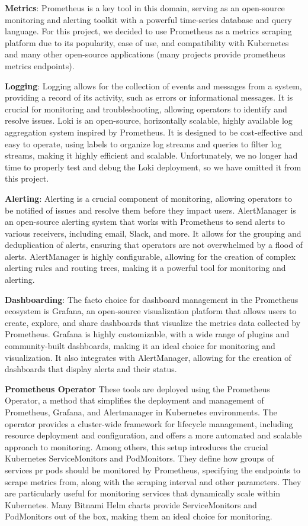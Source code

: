 \documentclass{report}
\begin{document}
    \textbf{Metrics}:
    Prometheus is a key tool in this domain, serving as an open-source monitoring and alerting toolkit with a powerful time-series database and query language. For this project, we decided to use Prometheus as a metrics scraping platform due to its popularity, ease of use, and compatibility with Kubernetes and many other open-source applications (many projects provide prometheus metrics endpoints).

    \textbf{Logging}:
    Logging allows for the collection of events and messages from a system, providing a record of its activity, such as errors or informational messages. It is crucial for monitoring and troubleshooting, allowing operators to identify and resolve issues. Loki is an open-source, horizontally scalable, highly available log aggregation system inspired by Prometheus. It is designed to be cost-effective and easy to operate, using labels to organize log streams and queries to filter log streams, making it highly efficient and scalable. Unfortunately, we no longer had time to properly test and debug the Loki deployment, so we have omitted it from this project.

    \textbf{Alerting}:
    Alerting is a crucial component of monitoring, allowing operators to be notified of issues and resolve them before they impact users. AlertManager is an open-source alerting system that works with Prometheus to send alerts to various receivers, including email, Slack, and more. It allows for the grouping and deduplication of alerts, ensuring that operators are not overwhelmed by a flood of alerts. AlertManager is highly configurable, allowing for the creation of complex alerting rules and routing trees, making it a powerful tool for monitoring and alerting.

    \textbf{Dashboarding}:
    The facto choice for dashboard management in the Prometheus ecosystem is Grafana, an open-source visualization platform that allows users to create, explore, and share dashboards that visualize the metrics data collected by Prometheus. Grafana is highly customizable, with a wide range of plugins and community-built dashboards, making it an ideal choice for monitoring and visualization. It also integrates with AlertManager, allowing for the creation of dashboards that display alerts and their status.

    \textbf{Prometheus Operator}
    These tools are deployed using the Prometheus Operator, a method that simplifies the deployment and management of Prometheus, Grafana, and Alertmanager in Kubernetes environments. The operator provides a cluster-wide framework for lifecycle management, including resource deployment and configuration, and offers a more automated and scalable approach to monitoring. Among others, this setup introduces the crucial Kubernetes ServiceMonitors and PodMonitors. They define how groups of services pr pods should be monitored by Prometheus, specifying the endpoints to scrape metrics from, along with the scraping interval and other parameters. They are particularly useful for monitoring services that dynamically scale within Kubernetes. Many Bitnami Helm charts provide ServiceMonitors and PodMonitors out of the box, making them an ideal choice for monitoring.
\end{document}
